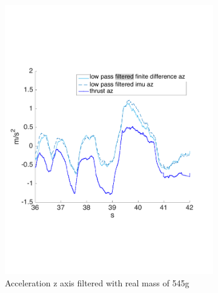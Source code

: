 \begin{figure}[!htbp]
 \centering   
  \begin{subfigure}[b]{0.45\textwidth}
     \includegraphics[width=\textwidth]{img/acceleration_mass_correct_filtered_z.pdf}
        \caption{Acceleration z axis filtered with real mass of 545g}
        \label{fig:comparison_accz_mass}
   \end{subfigure}
     \begin{subfigure}[b]{0.45\textwidth}

\end{subfigure}
\end{figure}
